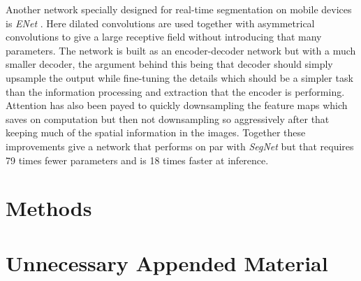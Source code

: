 \documentclass{kththesis}
\newcommand{\bibentry}[1]{\parencite{#1}}
\begin{document}
Another network specially designed for real-time segmentation on mobile devices is \emph{ENet} \bibentry{paszke2016enet}. Here dilated convolutions are used together with asymmetrical convolutions to give a large receptive field without introducing that many parameters. The network is built as an encoder-decoder network but with a much smaller decoder, the argument behind this being that decoder should simply upsample the output while fine-tuning the details which should be a simpler task than the information processing and extraction that the encoder is performing. Attention has also been payed to quickly downsampling the feature maps which saves on computation but then not downsampling so aggressively after that keeping much of the spatial information in the images. Together these improvements give a network that performs on par with \emph{SegNet} but that requires 79 times fewer parameters and is 18 times faster at inference.



\chapter{Methods}


\printbibliography[heading=bibintoc] %

\appendix

\chapter{Unnecessary Appended Material}
\end{document}
